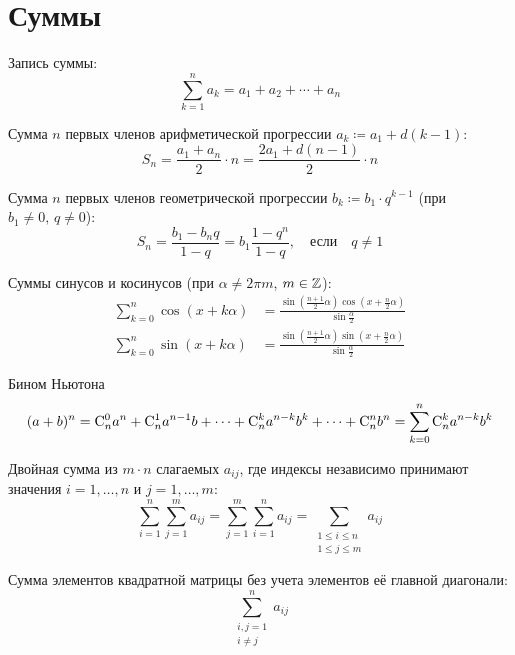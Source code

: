 \section{Суммы}

Запись суммы:
\[
    \sum_{k=1}^n a_k = a_1 + a_2 + \cdots + a_n
\]

Сумма $n$ первых членов арифметической прогрессии $a_k \coloneqq a_1 + d(k-1)$:
\[
    S_n = \frac{a_1 + a_n}{2} \cdot n = \frac{2a_1 + d(n-1)}{2} \cdot n
\]

Сумма $n$ первых членов геометрической прогрессии $b_k \coloneqq b_1 \cdot q^{k-1}$
(при $b_1 \neq 0, \, q \neq 0$):
\[
    S_n = \frac{b_1 - b_n q}{1-q} = b_1 \frac{1 - q^n}{1-q}, \quad \text{если} \quad q \neq 1
\]

Суммы синусов и косинусов (при $\alpha \neq 2 \pi m$, $m \in \mathbb{Z}$):
\begin{align*}
    \sum_{k=0}^n \cos(x + k\alpha) &=
        \frac{\sin\left(\frac{n+1}{2}\alpha\right)\cos\left(x
        + \frac{n}{2}\alpha\right)}{\sin \frac{\alpha}{2}} \\
    \sum_{k=0}^n \sin(x + k\alpha) &=
        \frac{\sin\left(\frac{n+1}{2}\alpha\right)\sin\left(x
        + \frac{n}{2}\alpha\right)}{\sin \frac{\alpha}{2}}
\end{align*}

\begin{theorem}{Бином Ньютона}{}
    \[
        (a+b)^n = \mathrm{C}_{n}^{0} a^n + \mathrm{C}_{n}^{1} a^{n-1}b + \cdots
        + \mathrm{C}_{n}^{k} a^{n-k}b^k + \cdots + \mathrm{C}_{n}^{n} b^n
        = \sum_{k=0}^n \mathrm{C}_{n}^{k} a^{n-k}b^k
    \]
\end{theorem}

Двойная сумма из $m \cdot n$ слагаемых $a_{ij}$,
где индексы независимо принимают значения $i=1,\dots,n$ и $j=1,\dots,m$:
\[
    \sum_{i=1}^n \sum_{j=1}^m a_{ij} = \sum_{j=1}^m \sum_{i=1}^n a_{ij}
    = \sum_{\substack{1 \le i \le n \\ 1 \le j \le m}} a_{ij}
\]

Сумма элементов квадратной матрицы без учета элементов её главной диагонали:
\[
    \sum_{\substack{i, j = 1 \\ i \neq j}}^n a_{ij}
\]
